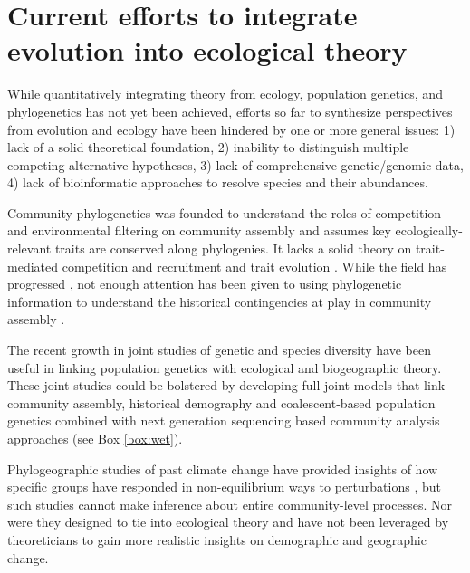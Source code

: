 \documentclass[12pt]{article}
\newcounter{Box}
\begin{document}
\section{Current efforts to integrate evolution into ecological theory} \label{sec:toDate}

While quantitatively integrating theory from ecology, population
genetics, and phylogenetics has not yet been achieved, efforts so far
to synthesize perspectives from evolution and ecology have been hindered by one or more general issues:
1) lack of a solid theoretical foundation, 2) inability to distinguish
multiple competing alternative hypotheses, 3) lack of comprehensive
genetic/genomic data, 4) lack of bioinformatic approaches to resolve species
and their abundances. 

Community phylogenetics \citep{Webb2002-yr} was founded to understand
the roles of competition and environmental filtering on community
assembly and  assumes key ecologically-relevant traits are conserved
along phylogenies. It lacks a solid theory on trait-mediated
competition and recruitment and trait evolution \citep{Losos2008-eq}. While the field has
progressed \citep[e.g.,][]{sukumaran2016}, not enough attention has been
given to using phylogenetic information to understand the historical
contingencies at play in community assembly \citep{Ricklefs2007-wo,
  Emerson2008-as}.

The recent growth in joint studies of genetic and species diversity
\citep{Vanoverbeke2015-ym, Vellend2005-up, Vellend2014-ir,
  Papadopoulou2011-bd} have been useful in linking population genetics
with ecological and biogeographic theory. These joint studies could be bolstered by
developing full joint models that link community assembly, historical
demography and coalescent-based population genetics combined with
next generation sequencing based community analysis approaches (see
Box \ref{box:wet}).

Phylogeographic studies of past climate change have provided insights
% 
% 
% 
of how specific groups have responded in non-equilibrium ways to
perturbations \citep{Arbogast2001-jx, Smith2012-db, Hickerson2005-ek,
  Satler2016-lb}, but such studies cannot make inference about entire
community-level processes. Nor were they designed to tie into
ecological theory and have not been leveraged by theoreticians to gain
more realistic insights on demographic and geographic change.
\end{document}
